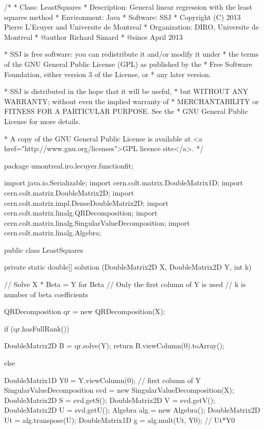 \begin{code}
\begin{hide}
/*
 * Class:        LeastSquares
 * Description:  General linear regression with the least squares method
 * Environment:  Java
 * Software:     SSJ
 * Copyright (C) 2013  Pierre L'Ecuyer and Universite de Montreal
 * Organization: DIRO, Universite de Montreal
 * @author       Richard Simard
 * @since        April 2013

 * SSJ is free software: you can redistribute it and/or modify it under
 * the terms of the GNU General Public License (GPL) as published by the
 * Free Software Foundation, either version 3 of the License, or
 * any later version.

 * SSJ is distributed in the hope that it will be useful,
 * but WITHOUT ANY WARRANTY; without even the implied warranty of
 * MERCHANTABILITY or FITNESS FOR A PARTICULAR PURPOSE.  See the
 * GNU General Public License for more details.

 * A copy of the GNU General Public License is available at
   <a href="http://www.gnu.org/licenses">GPL licence site</a>.
 */
\end{hide}
package umontreal.iro.lecuyer.functionfit; \begin{hide}

import java.io.Serializable;
import cern.colt.matrix.DoubleMatrix1D;
import cern.colt.matrix.DoubleMatrix2D;
import cern.colt.matrix.impl.DenseDoubleMatrix2D;
import cern.colt.matrix.linalg.QRDecomposition;
import cern.colt.matrix.linalg.SingularValueDecomposition;
import cern.colt.matrix.linalg.Algebra;
\end{hide}

public class LeastSquares\begin{hide} {

   private static double[] solution (DoubleMatrix2D X, DoubleMatrix2D Y, int k) {
      // Solve X * Beta = Y for Beta
      // Only the first column of Y is used
      // k is number of beta coefficients

      QRDecomposition qr = new QRDecomposition(X);

      if (qr.hasFullRank()) {
         DoubleMatrix2D B = qr.solve(Y);
         return B.viewColumn(0).toArray();

      } else {
         DoubleMatrix1D Y0 = Y.viewColumn(0);   // first column of Y
         SingularValueDecomposition svd = new SingularValueDecomposition(X);
         DoubleMatrix2D S = svd.getS();
         DoubleMatrix2D V = svd.getV();
         DoubleMatrix2D U = svd.getU();
         Algebra alg = new Algebra();
         DoubleMatrix2D Ut = alg.transpose(U);
         DoubleMatrix1D g = alg.mult(Ut, Y0);    // Ut*Y0

}}}
\end{hide}
\end{code}
